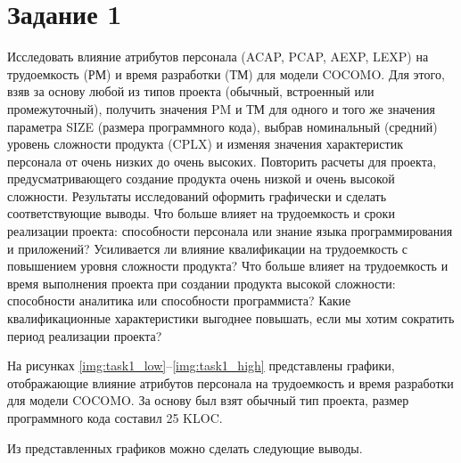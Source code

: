 \documentclass{bmstu}
\begin{document}
\clearpage

\section*{Задание 1}

Исследовать влияние атрибутов персонала (ACAP, PCAP, AEXP, LEXP) на трудоемкость (РМ) и время разработки (ТМ) для модели COCOMO. Для этого, взяв за основу любой из типов проекта (обычный, встроенный или промежуточный), получить значения PM и ТМ для одного и того же значения параметра SIZE (размера программного кода), выбрав номинальный (средний) уровень сложности продукта (CPLX) и изменяя значения характеристик персонала от очень низких до очень высоких. Повторить расчеты для проекта, предусматривающего создание продукта очень низкой и очень высокой сложности. Результаты исследований оформить графически и сделать соответствующие выводы. Что больше влияет на трудоемкость и сроки реализации проекта: способности персонала или знание языка программирования и приложений? Усиливается ли влияние квалификации на трудоемкость с повышением уровня сложности продукта? Что больше влияет на трудоемкость и время выполнения проекта при создании продукта высокой сложности: способности аналитика или способности программиста? Какие квалификационные характеристики выгоднее повышать, если мы хотим сократить период реализации проекта?

На рисунках \ref{img:task1_low}--\ref{img:task1_high} представлены графики, отображающие влияние атрибутов персонала на трудоемкость и время разработки для модели COCOMO. За основу был взят обычный тип проекта, размер программного кода составил 25 KLOC.

\clearpage



\clearpage


Из представленных графиков можно сделать следующие выводы.
\end{document}
